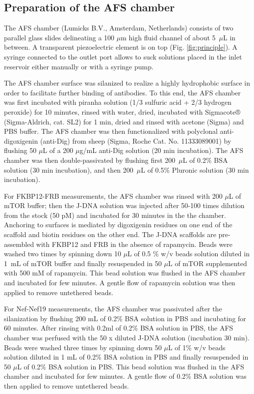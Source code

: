 \documentclass{biophys-new}
\begin{document}
\subsection*{Preparation of the AFS chamber}

The AFS chamber (Lumicks B.V., Amsterdam, Netherlands) consists of two parallel glass slides delineating a 100 $\mu$m high fluid channel of about 5 $\mu$L in between. A transparent piezoelectric element is on top (Fig. \ref{fig:principle}). 
A syringe connected to the outlet port allows to suck solutions placed in the inlet reservoir either manually or with a syringe pump.

The AFS chamber surface was silanized to realize a highly hydrophobic surface in order to facilitate further binding of antibodies. To this end, the AFS chamber was first incubated with piranha solution (1/3 sulfuric acid + 2/3 hydrogen peroxide) \cite{robert2008} for 10 minutes, rinsed with water, dried, incubated with Sigmacote® (Sigma-Aldrich, cat. SL2) for 1 min, dried and rinsed with acetone (Sigma) and PBS buffer.
The AFS chamber was then functionalized with polyclonal anti-digoxigenin (anti-Dig) from sheep (Sigma, Roche Cat. No. 11333089001) by flushing 50 $\mu$L of a 200 $\mu$g/mL anti-Dig solution (20 min incubation). The AFS chamber was then double-passivated by flushing first 200 $\mu$L of 0.2\% BSA solution (30 min incubation), and then 200 $\mu$L of 0.5\% Pluronic solution (30 min incubation).

%
For FKBP12-FRB measurements, the AFS chamber was rinsed with 200 $\mu$L of mTOR buffer; then the J-DNA solution was injected after 50-100 times dilution from the stock (50 pM) and incubated for 30 minutes in the the chamber. Anchoring to surfaces is mediated by digoxigenin residues on one end of the scaffold and biotin residues on the other end. The J-DNA scaffolds are pre-assembled with FKBP12 and FRB in the absence of rapamycin.
Beads were washed two times by spinning down 10 $\mu$L of 0.5 \% w/v beads solution diluted in 1 mL of mTOR buffer and finally resuspended in 50 $\mu$L of mTOR supplemented with 500 mM of rapamycin. This bead solution was flushed in the AFS chamber and incubated for few minutes. A gentle flow of rapamycin solution was then applied to remove untethered beads.

For Nef-Nef19 measurements, the AFS chamber was passivated after the silanization by flushing 200 mL of 0.2\% BSA solution in PBS and incubating for 60 minutes. After rinsing with 0.2ml of 0.2\% BSA solution in PBS, the AFS chamber was perfused with the 50 x diluted J-DNA solution (incubation 30 min). Beads were washed three times by spinning down 50 $\mu$L of 1\% w/v beads solution diluted in 1 mL of 0.2\% BSA solution in PBS and finally resuspended in 50 $\mu$L of 0.2\% BSA solution in PBS. This bead solution was flushed in the AFS chamber and incubated for few minutes. A gentle flow of 0.2\% BSA solution was then applied to remove untethered beads.
\end{document}
